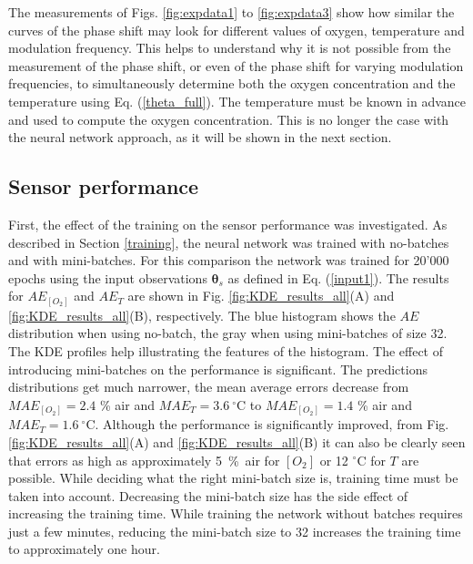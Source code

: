 \documentclass[final,5p,times,twocolumn]{elsarticle}
\begin{document}
The measurements of Figs. \ref{fig:expdata1} to \ref{fig:expdata3} show how similar the curves of the phase shift may look for different values of oxygen, temperature and modulation frequency. This helps to understand why it is not possible from the measurement of the phase shift, or even of the phase shift for varying modulation frequencies, to simultaneously determine both the oxygen concentration and the temperature using Eq. (\ref{theta_full}). The temperature must be known in advance and used to compute the oxygen concentration. This is no longer the case with the neural network approach, as it will be shown in the next section. 


\subsection{Sensor performance}

First, the effect of the training on the sensor performance was investigated. As described in Section \ref{training}, the neural network was trained with no-batches and with mini-batches. For this comparison the network was trained for 20'000 epochs using the input observations ${\pmb \theta}_s$ as defined in Eq. (\ref{input1}). The results for $AE_{[O_2]}$ and $AE_T$ are shown in Fig. \ref{fig:KDE_results_all}(A) and \ref{fig:KDE_results_all}(B), respectively. The blue histogram shows the $AE$ distribution when using no-batch, the gray when using mini-batches of size 32. The KDE profiles help illustrating the features of the histogram. The effect of introducing mini-batches on the performance is significant. The predictions distributions get much narrower, the mean average errors decrease from $MAE_{[O_2]}=2.4$ \% air and $MAE_{T}=3.6 \ ^\circ$C to $MAE_{[O_2]}=1.4$ \% air and $MAE_{T}=1.6 \ ^\circ$C. Although the performance is significantly improved, from Fig. \ref{fig:KDE_results_all}(A) and \ref{fig:KDE_results_all}(B) it can also be clearly seen that errors as high as approximately 5~\%~air for $[O_2]$ or 12 $^\circ$C for $T$ are possible. While deciding what the right mini-batch size is, training time must be taken into account. Decreasing the mini-batch size has the side effect of increasing the training time. While training the network without batches requires just a few minutes, reducing the mini-batch size to 32 increases the training time to approximately one hour.
\end{document}

